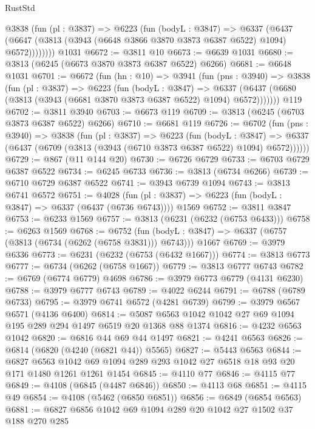 \begin{lexlean}{RustStd}
\begin{coremodule}
        @3838
          (fun (pl : @3837) =>
          @6223
            (fun (bodyL : @3847) =>
            @6337
              (@6437 (@6647 (@3813 (@3943 (@6648 @3866 @3870 @3873 @6387 @6522) @1094) @6572))))))))
    @1031
@6672 := @3811 @10
@6673 := @6639 @1031
@6680 := @3813 (@6245 (@6673 @3870 @3873 @6387 @6522) @6266)
@6681 := @6648 @1031
@6701 := @6672
    (fun (hn : @10) =>
    @3941
      (fun (pns : @3940) =>
      @3838
        (fun (pl : @3837) =>
        @6223
          (fun (bodyL : @3847) =>
          @6337 (@6437 (@6680 (@3813 (@3943 (@6681 @3870 @3873 @6387 @6522) @1094) @6572)))))))
    @119
@6702 := @3811 @3940
@6703 := @6673 @119
@6709 := @3813 (@6245 (@6703 @3873 @6387 @6522) @6266)
@6710 := @6681 @119
@6726 := @6702
    (fun (pns : @3940) =>
    @3838
      (fun (pl : @3837) =>
      @6223
        (fun (bodyL : @3847) =>
        @6337 (@6437 (@6709 (@3813 (@3943 (@6710 @3873 @6387 @6522) @1094) @6572))))))
@6729 := @867 (@11 @144 @20)
@6730 := @6726 @6729
@6733 := @6703 @6729 @6387 @6522
@6734 := @6245 @6733
@6736 := @3813 (@6734 @6266)
@6739 := @6710 @6729 @6387 @6522
@6741 := @3943 @6739 @1094
@6743 := @3813 @6741 @6572
@6751 := @4028
    (fun (pl : @3837) => @6223 (fun (bodyL : @3847) => @6337 (@6437 (@6736 @6743))))
    @1569
@6752 := @3811 @3847
@6753 := @6233 @1569
@6757 := @3813 (@6231 (@6232 (@6753 @6433)))
@6758 := @6263 @1569
@6768 := @6752
    (fun (bodyL : @3847) => @6337 (@6757 (@3813 (@6734 (@6262 (@6758 @3831))) @6743)))
    @1667
@6769 := @3979 @6336
@6773 := @6231 (@6232 (@6753 (@6432 @1667)))
@6774 := @3813 @6773
@6777 := @6734 (@6262 (@6758 @1667))
@6779 := @3813 @6777 @6743
@6782 := @6769 (@6774 @6779) @4698
@6786 := @3979 @6773 @6779 (@4131 @6230)
@6788 := @3979 @6777 @6743
@6789 := @4022 @6244
@6791 := @6788 (@6789 @6733)
@6795 := @3979 @6741 @6572 (@4281 @6739)
@6799 := @3979 @6567 @6571 (@4136 @6400)
@6814 := @5087 @6563 @1042 @1042 @27 @69 @1094 @195 @289 @294 @1497 @6519 @20 @1368 @88 @1374
@6816 := @4232 @6563 @1042
@6820 := @6816 @44 @69 @44 @1497
@6821 := @4241 @6563
@6826 := @6814 (@6820 (@4240 (@6821 @44)) @5565)
@6827 := @5443 @6563
@6844 := @6827
    @6563
    @1042
    @69
    @1094
    @289
    @293
    @1042
    @27
    @6518
    @18
    @93
    @20
    @171
    @1480
    @1261
    @1261
    @1454
@6845 := @4110 @77
@6846 := @4115 @77
@6849 := @4108 (@6845 (@4487 @6846))
@6850 := @4113 @68
@6851 := @4115 @49
@6854 := @4108 (@5462 (@6850 @6851))
@6856 := @6849 (@6854 @6563)
@6881 := @6827
    @6856
    @1042
    @69
    @1094
    @289
    @20
    @1042
    @27
    @1502
    @37
    @188
    @270
    @285

\end{coremodule}
\end{lexlean}
